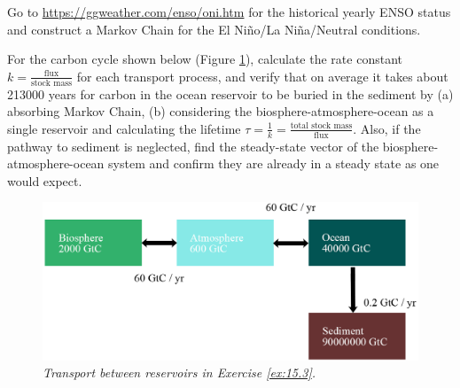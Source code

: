 \begin{Exercise}
Go to \href{https://ggweather.com/enso/oni.htm}{https://ggweather.com/enso/oni.htm} for the historical yearly ENSO status and construct a Markov Chain for the El Niño/La Niña/Neutral conditions.
\end{Exercise}

\begin{Exercise}
\label{ex:15.3}
For the carbon cycle shown below (Figure \ref{fig:ex15.3}), calculate the rate constant $k = \frac{\text{flux}}{\text{stock mass}}$ for each transport process, and verify that on average it takes about 213000 years for carbon in the ocean reservoir to be buried in the sediment by (a) absorbing Markov Chain, (b) considering the biosphere-atmosphere-ocean as a single reservoir and calculating the lifetime $\tau = \frac{1}{k} = \frac{\text{total stock mass}}{\text{flux}}$. Also, if the pathway to sediment is neglected, find the steady-state vector of the biosphere-atmosphere-ocean system and confirm they are already in a steady state as one would expect.
\begin{figure}
    \centering
    \includegraphics[scale = 1.1]{graphics/carboncycle.png}
    \caption{\textit{Transport between reservoirs in Exercise \ref{ex:15.3}.}}
    \label{fig:ex15.3}
\end{figure}
\end{Exercise}
